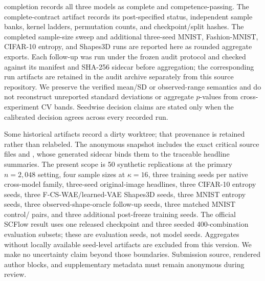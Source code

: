 completion records all three models as complete and competence-passing.  The
complete-contract artifact records its post-specified status, independent sample
banks, kernel ladders, permutation counts, and checkpoint/split hashes.
The completed sample-size sweep and additional three-seed MNIST,
Fashion-MNIST, CIFAR-10 entropy, and Shapes3D runs are reported here as
rounded aggregate exports.  Each follow-up was run under the frozen audit
protocol and checked against its manifest and SHA-256 sidecar before
aggregation; the corresponding run artifacts are retained in the audit
archive separately from this source repository.  We preserve the verified
mean/SD or observed-range semantics and do not reconstruct unreported
standard deviations or aggregate $p$-values from cross-experiment CV bands.
Seedwise decision claims are stated only when the calibrated decision agrees
across every recorded run.

Some historical artifacts record a dirty worktree; that provenance is retained
rather than relabeled.  The anonymous snapshot includes the exact critical
source files and , whose generated
sidecar binds them to the traceable headline summaries.  The present scope is 50
synthetic replications at the primary
$n=2{,}048$ setting, four sample sizes at $\kappa=16$, three training seeds per
native cross-model family, three-seed original-image headlines, three
CIFAR-10 entropy seeds, three F-CS-WAE/learned-VAE Shapes3D seeds, three
MNIST entropy seeds, three observed-shape-oracle follow-up seeds, three matched
MNIST control/\FACT{} pairs, and three additional post-freeze \FACT{} training
seeds.  The official SCFlow result uses one released checkpoint and three
seeded 400-combination evaluation subsets; these are evaluation seeds, not
model seeds.  Aggregates without locally available seed-level artifacts are
excluded from this version.  We make no uncertainty claim beyond those
boundaries.  Submission
source, rendered author blocks, and supplementary metadata must remain
anonymous during review.
